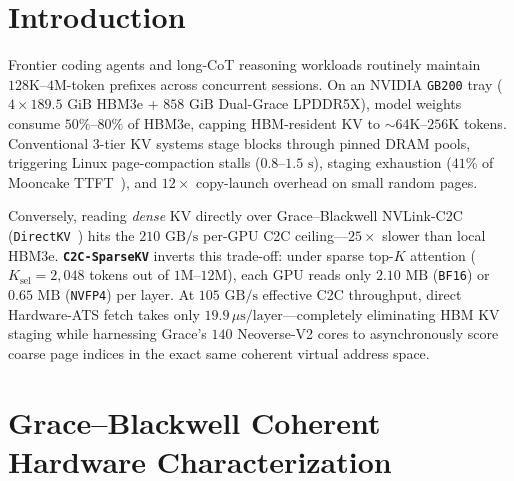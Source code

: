 \documentclass[conference,10pt]{IEEEtran}
\begin{document}
\begin{abstract}
\begin{itemize}
    \item \textbf{Faster Than Local \texttt{HBM3e BF16} at $B{=}1$--$4$:} On full 48-layer \texttt{TP=4} serving with live coherent page-ID handoff (zero \texttt{cudaMemcpy}), \texttt{C2C-SparseKV-NVFP4} runs in \textbf{$6.56\text{ ms}$ vs.\ $6.67\text{ ms}$ HBM ($-1.6\%$)} at $B{=}1$ and \textbf{$8.58\text{ ms}$ vs.\ $8.62\text{ ms}$ ($-0.5\%$, $466\text{ tok/s}$)} at $B{=}4$, while slashing $B{=}16$ C2C overhead $4.07\times$ ($+35.4\% \to +8.7\%$, $867\text{ tok/s}$).
\end{itemize}
\end{abstract}

\section{Introduction}
Frontier coding agents and long-CoT reasoning workloads routinely maintain $128\text{K}$--$4\text{M}$-token prefixes across concurrent sessions. On an NVIDIA \texttt{GB200} tray ($4\times 189.5\text{ GiB}$ HBM3e + $858\text{ GiB}$ Dual-Grace LPDDR5X), model weights consume $50\%$--$80\%$ of HBM3e, capping HBM-resident KV to $\sim 64\text{K}$--$256\text{K}$ tokens. Conventional 3-tier KV systems stage blocks through pinned DRAM pools, triggering Linux page-compaction stalls ($0.8$--$1.5\text{ s}$), staging exhaustion ($41\%$ of Mooncake TTFT~\cite{flatcake2026}), and $12\times$ copy-launch overhead on small random pages.

Conversely, reading \emph{dense} KV directly over Grace--Blackwell NVLink-C2C (\texttt{DirectKV}~\cite{directkv2026}) hits the $210\text{ GB/s}$ per-GPU C2C ceiling---$25\times$ slower than local HBM3e. \textbf{\texttt{C2C-SparseKV}} inverts this trade-off: under sparse top-$K$ attention ($K_{\text{sel}}{=}2{,}048$ tokens out of $1\text{M}$--$12\text{M}$), each GPU reads only $2.10\text{ MB}$ (\texttt{BF16}) or \textbf{$0.65\text{ MB}$} (\texttt{NVFP4}) per layer. At $105\text{ GB/s}$ effective C2C throughput, direct Hardware-ATS fetch takes only $19.9\,\mu\text{s/layer}$---completely eliminating HBM KV staging while harnessing Grace's $140$ Neoverse-V2 cores to asynchronously score coarse page indices in the exact same coherent virtual address space.

\section{Grace--Blackwell Coherent Hardware Characterization}
\end{document}
